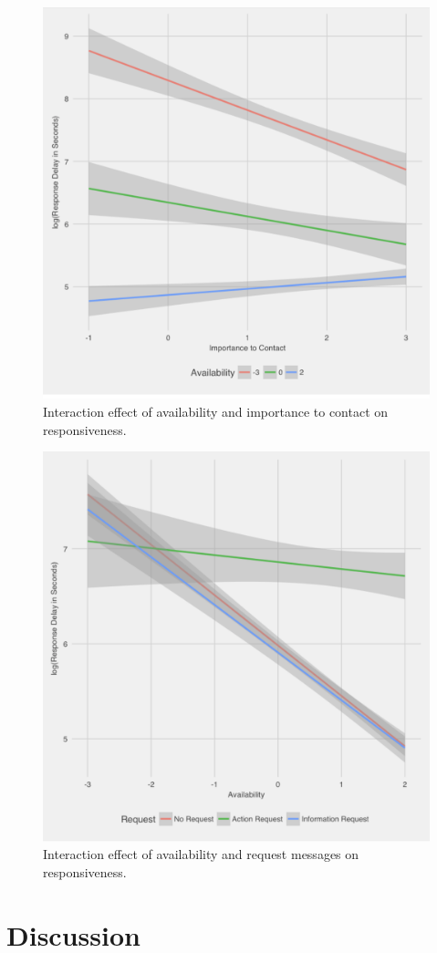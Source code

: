 \documentclass[12pt]{nuthesis}	%
\begin{document}
\begin{figure}[h]
\centering
\includegraphics[width=.7\textwidth]{figures/importance_contact_availability_interaction}
\caption{Interaction effect of availability and importance to contact on responsiveness.}
\label{fig:importance_contact_availability_interaction}
\end{figure}

\begin{figure}[h]
\centering
\includegraphics[width=.7\textwidth]{figures/request_availability_interaction}
\caption{Interaction effect of availability and request messages on responsiveness.}
\label{fig:request_availability_interaction}
\end{figure}


\chapter{Discussion}
\end{document}
